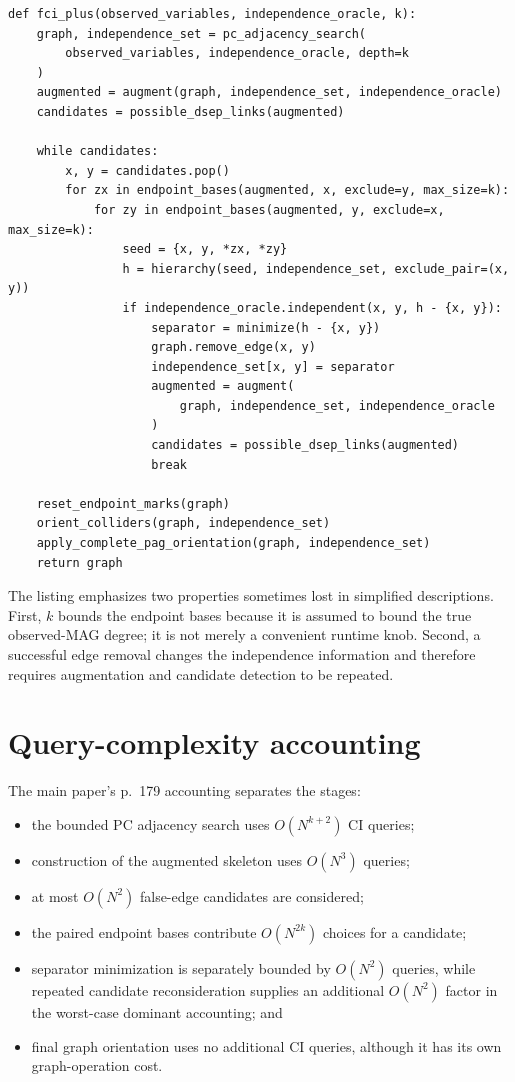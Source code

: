 \documentclass[11pt,a4paper,oneside]{report}
\begin{document}
\begin{lstlisting}[style=python,
caption={Control-flow summary of Claassen et al.'s Algorithm 2.}]
def fci_plus(observed_variables, independence_oracle, k):
    graph, independence_set = pc_adjacency_search(
        observed_variables, independence_oracle, depth=k
    )
    augmented = augment(graph, independence_set, independence_oracle)
    candidates = possible_dsep_links(augmented)

    while candidates:
        x, y = candidates.pop()
        for zx in endpoint_bases(augmented, x, exclude=y, max_size=k):
            for zy in endpoint_bases(augmented, y, exclude=x, max_size=k):
                seed = {x, y, *zx, *zy}
                h = hierarchy(seed, independence_set, exclude_pair=(x, y))
                if independence_oracle.independent(x, y, h - {x, y}):
                    separator = minimize(h - {x, y})
                    graph.remove_edge(x, y)
                    independence_set[x, y] = separator
                    augmented = augment(
                        graph, independence_set, independence_oracle
                    )
                    candidates = possible_dsep_links(augmented)
                    break

    reset_endpoint_marks(graph)
    orient_colliders(graph, independence_set)
    apply_complete_pag_orientation(graph, independence_set)
    return graph
\end{lstlisting}

The listing emphasizes two properties sometimes lost in simplified
descriptions.  First, \(k\) bounds the endpoint bases because it is assumed to
bound the true observed-MAG degree; it is not merely a convenient runtime
knob.  Second, a successful edge removal changes the independence information
and therefore requires augmentation and candidate detection to be repeated.

\section{Query-complexity accounting}

The main paper's p.~179 accounting separates the stages:

\begin{itemize}[leftmargin=2em]
  \item the bounded PC adjacency search uses
        \(O(N^{k+2})\) CI queries;
  \item construction of the augmented skeleton uses \(O(N^3)\) queries;
  \item at most \(O(N^2)\) false-edge candidates are considered;
  \item the paired endpoint bases contribute \(O(N^{2k})\) choices for a
        candidate;
  \item separator minimization is separately bounded by \(O(N^2)\) queries,
        while repeated candidate reconsideration supplies an additional
        \(O(N^2)\) factor in the worst-case dominant accounting; and
  \item final graph orientation uses no additional CI queries, although it has
        its own graph-operation cost.
\end{itemize}
\end{document}
